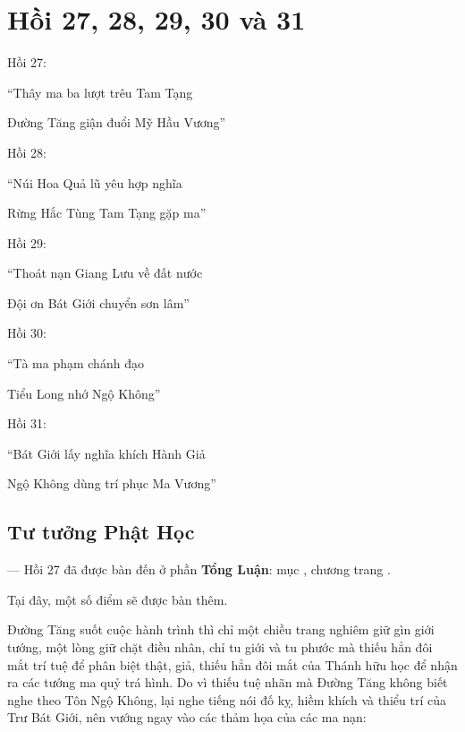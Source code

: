 \chapter{Hồi 27, 28, 29, 30 và 31} %
\label{cha:hoi_27_28}

Hồi 27:

\begin{itshape}
``Thây ma ba lượt trêu Tam Tạng

Đường Tăng giận đuổi Mỹ Hầu Vương''
\end{itshape}

Hồi 28:

\begin{itshape}
``Núi Hoa Quả lũ yêu hợp nghĩa

Rừng Hắc Tùng Tam Tạng gặp ma''
\end{itshape}

Hồi 29:

\begin{itshape}
``Thoát nạn Giang Lưu về đất nước

Đội ơn Bát Giới chuyển sơn lâm''
\end{itshape}

Hồi 30:

\begin{itshape}
``Tà ma phạm chánh đạo

Tiểu Long nhớ Ngộ Không''
\end{itshape}

Hồi 31:

\begin{itshape}
``Bát Giới lấy nghĩa khích Hành Giả

Ngộ Không dùng trí phục Ma Vương''
\end{itshape}

\section{Tư tưởng Phật Học} %
\label{sec:27_28_phat_hoc}

— Hồi 27 đã được bàn đến ở phần {\bf Tổng Luận}: mục , chương  trang \pageref{sec:bieu_tuong_cua_hoi_thu_26}.

Tại đây, một số điểm sẽ được bàn thêm.

Đường Tăng suốt cuộc hành trình thì chỉ một chiều trang nghiêm giữ gìn giới tướng, một lòng giữ chặt điều nhân, chỉ tu giới và tu phước mà thiếu hẳn đôi mắt trí tuệ để phân biệt thật, giả, thiếu hẳn đôi mắt của Thánh hữu học để nhận ra các tướng ma quỷ trá hình. Do vì thiếu tuệ nhãn mà Đường Tăng không biết nghe theo Tôn Ngộ Không, lại nghe tiếng nói đố kỵ, hiềm khích và thiểu trí của Trư Bát Giới, nên vướng ngay vào các thảm họa của các ma nạn:

